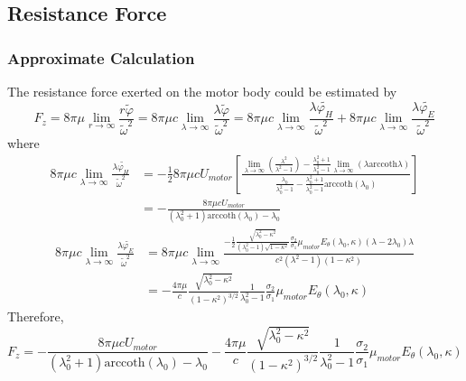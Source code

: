 \documentclass[fontsize=11pt, %
                             paper=a4, %
                             twoside, %
                             captions=tableheading,
                             index=totoc,
                             hyperref]{labbook}
\begin{document}
\begin{addmargin}[4cm]{0cm}
\subsection{Resistance Force}
\subsubsection{Approximate Calculation}
The resistance force exerted on the motor body could be estimated by
\begin{equation}
F_z=8\pi\mu\lim_{r\to\infty}\frac{r\tilde\varphi}{\tilde{\omega}^2}=8\pi\mu c\lim_{\lambda\to\infty}\frac{\lambda\tilde\varphi}{\tilde{\omega}^2}=8\pi\mu c\lim_{\lambda\to\infty}\frac{\lambda\tilde{\varphi_H}}{\tilde{\omega}^2}+8\pi\mu c\lim_{\lambda\to\infty}\frac{\lambda\tilde{\varphi_E}}{\tilde{\omega}^2}
\end{equation}
where
\begin{equation}
\begin{aligned}
8\pi\mu c\lim_{\lambda\to\infty}\frac{\lambda\tilde{\varphi_H}}{\tilde{\omega}^2}&=-\frac{1}{2}8\pi\mu c U_{motor}\left[\frac{\lim_{\lambda\to\infty}\left(\frac{\lambda^2}{\lambda^2-1}\right)-\frac{\lambda_0^2+1}{\lambda_0^2-1}\lim_{\lambda\to\infty}\left(\lambda\mathrm{arccoth}\lambda\right)}{\frac{\lambda_0}{\lambda_0^2-1}-\frac{\lambda_0^2+1}{\lambda_0^2-1}\mathrm{arccoth}(\lambda_0)}\right]\\
&=-\frac{8\pi\mu c U_{motor}}{(\lambda_0^2+1)\mathrm{arccoth}(\lambda_0)-\lambda_0}
\end{aligned}
\end{equation}
\begin{equation}
\begin{aligned}
8\pi\mu c\lim_{\lambda\to\infty}\frac{\lambda\tilde{\varphi_E}}{\tilde{\omega}^2}&=8\pi\mu c\lim_{\lambda\to\infty}\frac{-\frac{1}{2}\frac{\sqrt{\lambda_0^2-\kappa^2}}{(\lambda_0^2-1)\sqrt{1-\kappa^2}}\frac{\sigma_2}{\sigma_1}\mu_{motor}E_\theta(\lambda_0,\kappa)(\lambda-2\lambda_0)\lambda}{c^2(\lambda^2-1)(1-\kappa^2)}\\
&=-\frac{4\pi\mu}{c}\frac{\sqrt{\lambda_0^2-\kappa^2}}{(1-\kappa^2)^{3/2}}\frac{1}{\lambda_0^2-1}\frac{\sigma_2}{\sigma_1}\mu_{motor}E_\theta(\lambda_0,\kappa)
\end{aligned}
\end{equation}
Therefore,
\begin{equation}
F_z=-\frac{8\pi\mu c U_{motor}}{(\lambda_0^2+1)\mathrm{arccoth}(\lambda_0)-\lambda_0}-\frac{4\pi\mu}{c}\frac{\sqrt{\lambda_0^2-\kappa^2}}{(1-\kappa^2)^{3/2}}\frac{1}{\lambda_0^2-1}\frac{\sigma_2}{\sigma_1}\mu_{motor}E_\theta(\lambda_0,\kappa)
\end{equation}

\end{addmargin}
\end{document}
